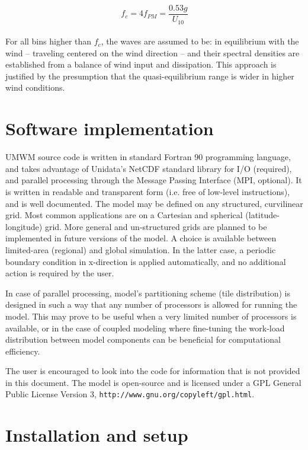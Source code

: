 \documentclass[letterpaper]{article}
\numberwithin{equation}{section}
\begin{document}
\begin{equation}
f_{c}=4f_{PM}=\dfrac{0.53g}{U_{10}}
\end{equation}
\\
For all bins higher than $f_{c}$, the waves are assumed to be:  
in equilibrium with the wind -- traveling centered on the wind direction -- and their spectral densities are established
from a balance of wind input and dissipation. 
This approach is justified by the presumption that  
the quasi-equilibrium range is wider in higher wind conditions.



\newpage
\section{Software implementation}

UMWM source code is written in standard Fortran 90 programming language,
and takes advantage of Unidata's NetCDF standard library for I/O (required),
and parallel processing through the Message Passing Interface (MPI, optional). 
It is written in readable and transparent form 
(i.e. free of low-level instructions), and is well documented. 
The model may be defined on any structured, curvilinear grid. 
Most common applications are on a Cartesian and spherical (latitude-longitude) grid.
More general and un-structured grids are planned 
to be implemented in future versions of the model.
A choice is available between limited-area (regional) and global simulation.
In the latter case, a periodic boundary condition in x-direction is applied automatically,
and no additional action is required by the user.

In case of parallel processing, model's partitioning scheme (tile distribution)
is designed in such a way that any number of processors is allowed for running the model.
This may prove to be useful when a very limited number of processors is available,
or in the case of coupled modeling where fine-tuning the work-load distribution 
between model components can be beneficial for computational efficiency.

The user is encouraged to look into the code for information that is not provided in this document.
The model is open-source and is licensed under a GPL General Public License Version 3,
\verb+http://www.gnu.org/copyleft/gpl.html+.

\newpage
\section{Installation and setup}
\end{document}
